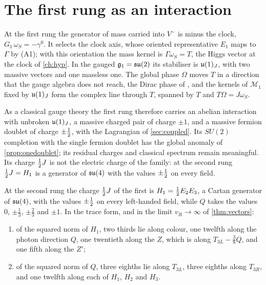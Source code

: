 \section{The first rung as an interaction}
\label{sec:rung1int}

At the first rung the generator of mass carried into $V^-$ is minus the clock, $G_1\,\omega_S=-\gamma^0$. It selects the clock axis, whose
oriented representative $E_1$ maps to $\Gamma$ by (A1); with this orientation the mass kernel is $\Gamma\omega_S=T$, the Higgs vector at the
clock of \cref{ch:hyp}. In the gauged $\mathfrak g_1=\mathfrak{su}(2)$
its stabiliser is $\mathfrak{u}(1)_J$, with two massive vectors and one massless one. The global phase $\Omega$ moves $T$ in a direction that the gauge
algebra does not reach, the Dirac phase of , and the kernels of $\mathcal M_1$ fixed by $\mathfrak{u}(1)_J$ form the complex line through
$T$, spanned by $T$ and $T\Omega=J\omega_S$.

As a classical gauge theory the first rung therefore carries an abelian interaction with unbroken $\mathfrak{u}(1)_J$, a massive charged pair of
charge $\pm1$, and a massive fermion doublet of charge $\pm\tfrac12$, with the Lagrangian of \cref{sec:coupled}. Its $SU(2)$ completion with the
single fermion doublet has the global anomaly of \cref{prop:onedoublet}; its residual charges and classical spectrum remain meaningful. Its
charge $\tfrac12 J$ is not the electric charge of the family: at the second rung $\tfrac12 J=H_1$ is a generator of $\mathfrak{su}(4)$ with the values
$\pm\tfrac12$ on every field.

\begin{proposition}
\label{prop:rung1charge}
At the second rung the charge $\tfrac12 J$ of the first is $H_1=\tfrac12 E_2E_3$, a Cartan generator of $\mathfrak{su}(4)$, with the values $\pm\tfrac12$ on
every left-handed field, while $Q$ takes the values $0$, $\pm\tfrac13$, $\pm\tfrac23$ and $\pm1$. In the trace form, and in the limit
$v_R\to\infty$ of \cref{thm:vectors}:
\begin{enumerate}[label=(\roman*),leftmargin=2.2em,itemsep=1pt]
\item of the squared norm of $H_1$, two thirds lie along colour, one twelfth along the photon direction $Q$, one twentieth along the $Z$,
which is along $T_{3L}-\tfrac38Q$, and one fifth along the $Z'$;
\item of the squared norm of $Q$, three eighths lie along $T_{3L}$, three eighths along $T_{3R}$, and one twelfth along each of $H_1$, $H_2$
and $H_3$.
\end{enumerate}
\end{proposition}

